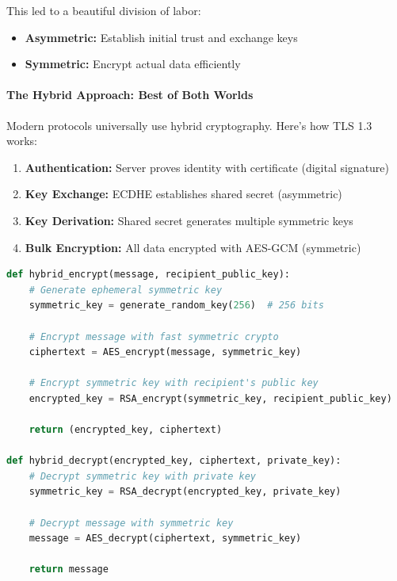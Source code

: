 \documentclass[11pt,a4paper]{article}
\begin{document}
This led to a beautiful division of labor:
\begin{itemize}
    \item \textbf{Asymmetric:} Establish initial trust and exchange keys
    \item \textbf{Symmetric:} Encrypt actual data efficiently
\end{itemize}

\paragraph{The Hybrid Approach: Best of Both Worlds}

Modern protocols universally use hybrid cryptography. Here's how TLS 1.3 works:

\begin{enumerate}
    \item \textbf{Authentication:} Server proves identity with certificate (digital signature)
    \item \textbf{Key Exchange:} ECDHE establishes shared secret (asymmetric)
    \item \textbf{Key Derivation:} Shared secret generates multiple symmetric keys
    \item \textbf{Bulk Encryption:} All data encrypted with AES-GCM (symmetric)
\end{enumerate}

\begin{lstlisting}[language=Python, caption=Simplified Hybrid Encryption]
def hybrid_encrypt(message, recipient_public_key):
    # Generate ephemeral symmetric key
    symmetric_key = generate_random_key(256)  # 256 bits
    
    # Encrypt message with fast symmetric crypto
    ciphertext = AES_encrypt(message, symmetric_key)
    
    # Encrypt symmetric key with recipient's public key
    encrypted_key = RSA_encrypt(symmetric_key, recipient_public_key)
    
    return (encrypted_key, ciphertext)

def hybrid_decrypt(encrypted_key, ciphertext, private_key):
    # Decrypt symmetric key with private key
    symmetric_key = RSA_decrypt(encrypted_key, private_key)
    
    # Decrypt message with symmetric key
    message = AES_decrypt(ciphertext, symmetric_key)
    
    return message
\end{lstlisting}
\end{document}
